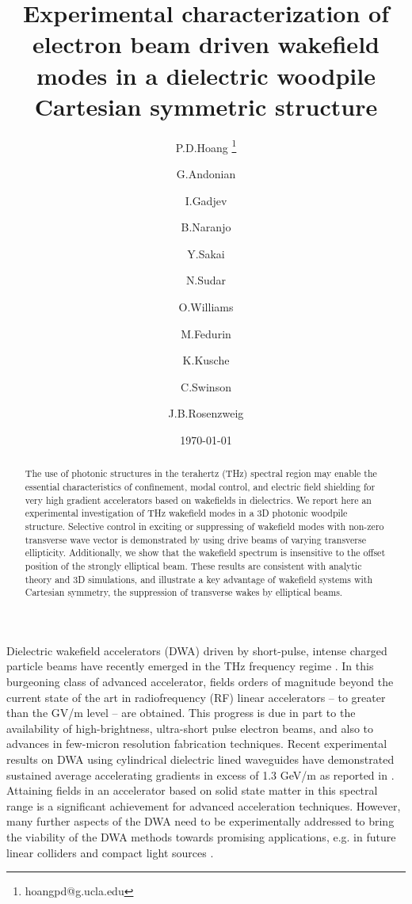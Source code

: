 \documentclass{article}
\begin{document}
\title{Experimental characterization of electron beam driven wakefield modes in a dielectric woodpile Cartesian symmetric structure}
\author[1]{P.D.Hoang \thanks{hoangpd@g.ucla.edu}}
\author[1]{G.Andonian}
\author[1]{I.Gadjev}
\author[1]{B.Naranjo}
\author[1]{Y.Sakai}
\author[1]{N.Sudar}
\author[1]{O.Williams}
\author[2]{M.Fedurin}
\author[2]{K.Kusche}
\author[2]{C.Swinson}
\author[1]{J.B.Rosenzweig}

\date{\today}

\begin{abstract}
The use of photonic structures in the terahertz (THz) spectral region may enable the essential characteristics of confinement, modal control, and electric field shielding for very high gradient accelerators based on wakefields in dielectrics. We report here an experimental investigation of THz wakefield modes in a 3D photonic woodpile structure. Selective control in exciting or suppressing of wakefield modes with non-zero transverse wave vector is demonstrated by using drive beams of varying transverse ellipticity.  Additionally, we show that the wakefield spectrum is insensitive to the offset position of the strongly elliptical beam. These results are consistent with analytic theory and 3D simulations, and illustrate a key advantage of wakefield systems with Cartesian symmetry, the suppression of transverse wakes by elliptical beams.
\end{abstract}
\maketitle
Dielectric wakefield accelerators (DWA) driven by short-pulse, intense charged particle beams have recently emerged in the THz frequency regime \cite{thompson2008}. In this burgeoning class of advanced accelerator, fields orders of magnitude beyond the current state of the art in radiofrequency (RF) linear accelerators – to greater than the GV/m level – are obtained. This progress is due in part to the availability of high-brightness, ultra-short pulse electron beams, and also to advances in few-micron resolution fabrication techniques. Recent experimental results on DWA using cylindrical dielectric lined waveguides have demonstrated sustained average accelerating gradients in excess of 1.3 GeV/m as reported in \cite{OShea2016}. Attaining fields in an accelerator based on solid state matter in this spectral range is a significant achievement for advanced acceleration techniques. However, many further aspects of the DWA need to be experimentally addressed to bring the viability of the DWA methods towards promising applications, e.g. in future linear colliders \cite{barish2008} and compact light sources \cite{emma2010}. 
\end{document}
